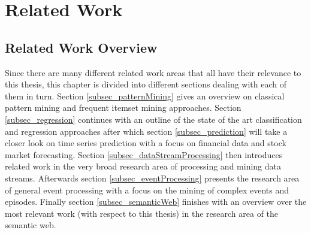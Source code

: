 
\chapter{Related Work}
\label{chapter_related}

\section{Related Work Overview}
\label{section_related}

\ifpdf
    \graphicspath{{Chapter2/Figs/Raster/}{Chapter2/Figs/PDF/}{Chapter2/Figs/}}
\else
    \graphicspath{{Chapter2/Figs/Vector/}{Chapter2/Figs/}}
\fi

Since there are many different related work areas that all have their relevance to this thesis, this chapter is divided into different sections dealing with each of them in turn. Section \ref{subsec_patternMining} gives an overview on classical pattern mining and frequent itemset mining approaches. Section \ref{subsec_regression} continues with an outline of the state of the art classification and regression approaches after which section \ref{subsec_prediction} will take a closer look on time series prediction with a focus on financial data and stock market forecasting.
Section \ref{subsec_dataStreamProcessing} then introduces related work in the very broad research area of processing and mining data streams. Afterwards section \ref{subsec_eventProcessing} presents the research area of general event processing with a focus on the mining of complex events and episodes. Finally section \ref{subsec_semanticWeb} finishes with an overview over the most relevant work (with respect to this thesis) in the research area of the semantic web.

